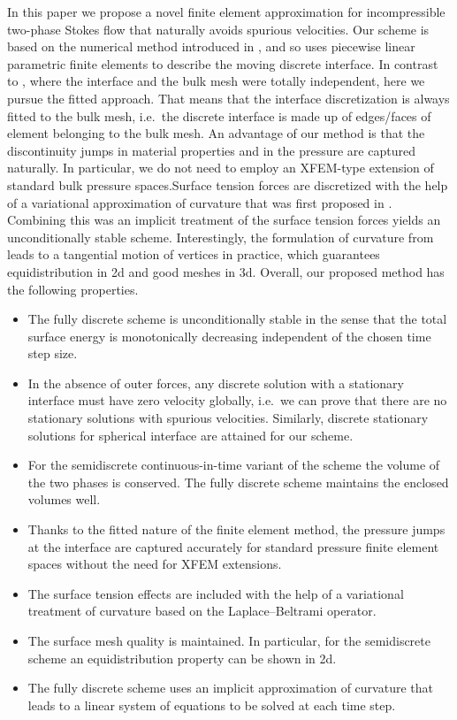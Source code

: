 \documentclass[a4paper,12pt,onecolumn]{article}
\begin{document}
In this paper we propose a novel finite element approximation for
incompressible two-phase Stokes flow that naturally avoids spurious
velocities. Our scheme is based on the numerical method introduced in
\cite{spurious}, and so uses piecewise linear parametric finite elements to
describe the moving discrete interface. In contrast to \cite{spurious}, where
the interface and the bulk mesh were totally independent, here we pursue the
fitted approach. That means that the interface discretization is always fitted
to the bulk mesh, i.e.\ the discrete interface is made up of edges/faces of
element belonging to the bulk mesh. An advantage of our method is that the
discontinuity jumps in material properties and in the pressure are captured
naturally. In particular, we do not need to employ an XFEM-type extension of
standard bulk pressure spaces.Surface tension forces are discretized with the
help of a variational approximation of curvature that was first proposed in
\cite{triplej,gflows3d}. Combining this was an implicit treatment of the
surface tension forces yields an unconditionally stable scheme. Interestingly,
the formulation of curvature from \cite{triplej} leads to a tangential motion
of vertices in practice, which guarantees equidistribution in 2d and good
meshes in 3d. Overall, our proposed method has the following properties.
\begin{itemize}
\item The fully discrete scheme is unconditionally stable in the sense that the
total surface energy is monotonically decreasing independent of the chosen time
step size.
\item In the absence of outer forces, any discrete solution with a stationary
interface must have zero velocity globally, i.e.\ we can prove that there are
no stationary solutions with spurious velocities. Similarly, discrete
stationary solutions for spherical interface are attained for our scheme.
\item For the semidiscrete continuous-in-time variant of the scheme the volume
of the two phases is conserved. The fully discrete scheme maintains the
enclosed volumes well.
\item Thanks to the fitted nature of the finite element method, the pressure
jumps at the interface are captured accurately for standard pressure finite
element spaces without the need for XFEM extensions.
\item The surface tension effects are included with the help of a variational
treatment of curvature based on the Laplace--Beltrami operator.
\item The surface mesh quality is maintained. In particular, for the
semidiscrete scheme an equidistribution property can be shown in 2d.
\item The fully discrete scheme uses an implicit approximation of curvature
that leads to a linear system of equations to be solved at each time step.
\end{itemize}
\end{document}
